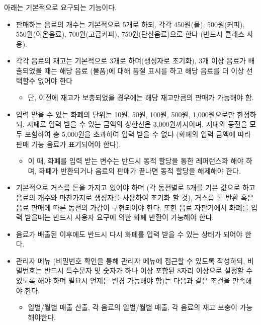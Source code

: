 \documentclass{oblivoir}
\begin{document}
    아래는 기본적으로 요구되는 기능이다.
    \begin{itemize}
        \item 판매하는 음료의 개수는 기본적으로 5개로 하되,
        각각 450원(물), 500원(커피), 550원(이온음료), 700원(고급커피),
        750원(탄산음료)으로 한다 (반드시 클래스 사용).
        \item 각각 음료의 재고는 기본적으로 3개로 하며(생성자로 초기화),
        3개 이상 음료가 배출되었을 때는 해당 음료 (물품)에 대해
        품절 표시를 하고 해당 음료를 더 이상 선택할수 없어야 한다
        \begin{itemize}
            \item 단, 이전에 재고가 보충되었을 경우에는 해당 재고만큼의 판매가 가능해야 함.
        \end{itemize}
        \item 입력 받을 수 있는 화폐의 단위는 10원, 50원, 100원, 500원,
        1,000원으로만 한정하되, 지폐로 입력 받을 수 있는 금액의
        상한선은 3,000원까지이며, 지폐와 동전을 모두 포함하여
        총 5,000원을 초과하여 입력 받을 수 없다
        (화폐의 입력 금액에 따라 판매 가능 음료가 표기되어야 한다).
        \begin{itemize}
            \item 이 때, 화폐를 입력 받는 변수는 반드시
            동적 할당을 통한 레퍼런스화 해야 하며,
            화폐가 반환되거나 음료의 판매가 끝나면
            동적 할당을 해제해야 한다.
        \end{itemize}
        \item 기본적으로 거스름 돈을 가지고 있어야 하며
        (각 동전별로 5개를 기본 값으로 하고 음료의 개수와 마찬가지로
        생성자를 사용하여 초기화 할 것),
        거스름 돈 반환 혹은 음료 판매에 따른 동전의
        가감이 구현되어야 한다.
        또한 음료 자판기에서 화폐를 입력 받을때는 반드시
        사용자 요구에 의한 화폐 반환이 가능해야 한다.
        \item 음료가 배출된 이후에도 반드시 다시 화폐를 입력 받을 수 있는
        상태가 되어야 한다.
        \item 관리자 메뉴 (비밀번호 확인을 통해 관리자 메뉴에 접근할
        수 있도록 작성하되, 비밀번호는 반드시 특수문자 및
        숫자가 하나 이상 포함된 8자리 이상으로 설정할 수 있도록 해야 하며
        필요시 언제든 변경 가능해야 함)는 다음과 같은 조건을 만족해야 한다.
        \begin{itemize}
            \item 일별/월별 매출 산출, 각 음료의 일별/월별 매출,
            각 음료의 재고 보충이 가능해야한다.

\end{itemize}
\end{itemize}
\end{document}
